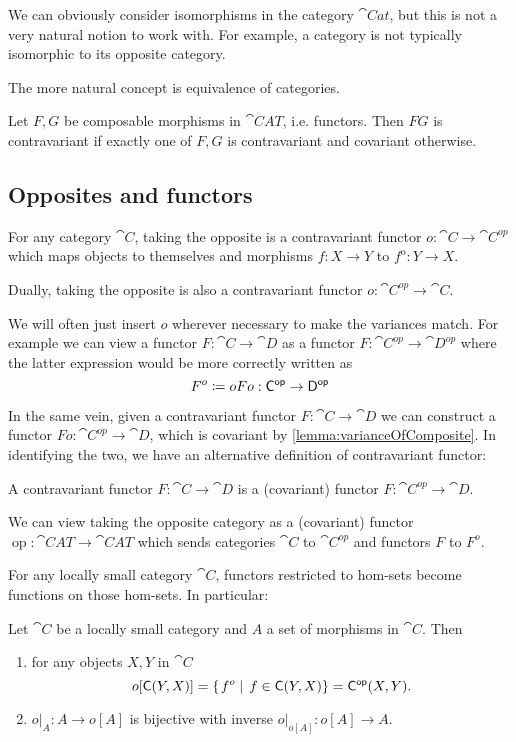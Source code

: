 We can obviously consider isomorphisms in the category $\cat{Cat}$, but this is not a very natural notion to work with. For example, a category is not typically isomorphic to its opposite category.

The more natural concept is equivalence of categories.

\begin{lemma} \label{lemma:varianceOfComposite}
Let $F,G$ be composable morphisms in $\cat{CAT}$, i.e. functors. Then $FG$ is contravariant if exactly one of $F,G$ is contravariant and covariant otherwise.
\end{lemma}

\subsection{Opposites and functors}
\begin{lemma}
For any category $\cat{C}$, taking the opposite is a contravariant functor $o: \cat{C}\to \cat{C^{op}}$ which maps objects to themselves and morphisms $f:X\to Y$ to $f^\text{o}: Y\to X$.

Dually, taking the opposite is also a contravariant functor $o: \cat{C^{op}}\to \cat{C}$.
\end{lemma}

We will often just insert $o$ wherever necessary to make the variances match. For example we can view a functor $F:\cat{C}\to \cat{D}$ as a functor $F:\cat{C^{op}}\to \cat{D^{op}}$ where the latter expression would be more correctly written as
\[ F^o \coloneqq oFo: \mathsf{C^{op}}\to \mathsf{D^{op}} \]

In the same vein, given a contravariant functor $F:\cat{C}\to \cat{D}$ we can construct a functor $Fo: \cat{C^{op}}\to \cat{D}$, which is covariant by \ref{lemma:varianceOfComposite}. In identifying the two, we have an alternative definition of contravariant functor:

\begin{lemma}
A contravariant functor $F:\cat{C}\to\cat{D}$ is a (covariant) functor $F:\cat{C^{op}}\to \cat{D}$.
\end{lemma}


\begin{lemma}
We can view taking the opposite category as a (covariant) functor $\operatorname{op}: \cat{CAT} \to \cat{CAT}$ which sends categories $\cat{C}$ to $\cat{C^{op}}$ and functors $F$ to $F^o$.
\end{lemma}


For any locally small category $\cat{C}$, functors restricted to hom-sets become functions on those hom-sets. In particular:
\begin{lemma}
Let $\cat{C}$ be a locally small category and $A$ a set of morphisms in $\cat{C}$. Then
\begin{enumerate}
\item for any objects $X,Y$ in $\cat{C}$
\[ o[\mathsf{C}(Y,X)] = \left\{\left. f^o \;\right|\; f \in \mathsf{C}(Y,X) \right\} = \mathsf{C^{op}}(X,Y).  \]
\item $o|_A: A \to o[A]$ is bijective with inverse $o|_{o[A]}: o[A] \to A$.
\end{enumerate}
\end{lemma}

